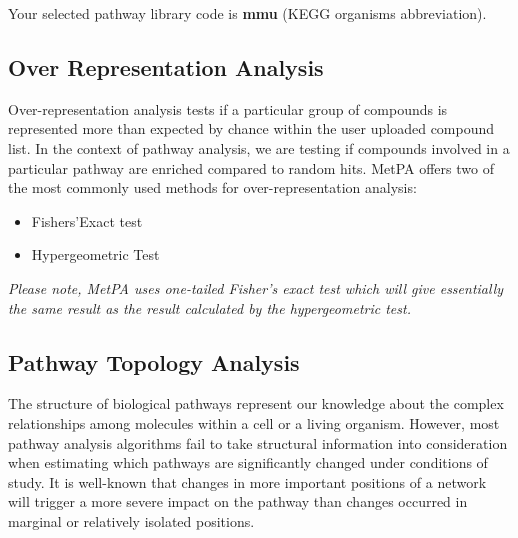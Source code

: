 \documentclass[a4paper]{article}
\begin{document}
Your selected pathway library code is \textbf{ mmu }(KEGG organisms abbreviation).


\subsection{Over Representation Analysis}

Over-representation analysis tests if a particular group of compounds
is represented more than expected by chance within the user uploaded compound
list. In the context of pathway analysis, we are testing if compounds involved
in a particular pathway are enriched compared to random hits. MetPA offers two of the
most commonly used methods for over-representation analysis: 

\begin{itemize}
\item{Fishers'Exact test}
\item{Hypergeometric Test}
\end{itemize}
\textit{Please note, MetPA uses one-tailed Fisher's exact test which will give essentially
the same result as the result calculated by the hypergeometric test.}






\subsection{Pathway Topology Analysis}

The structure of biological pathways represent our knowledge about the complex relationships among molecules
within a cell or a living organism. However, most pathway analysis algorithms fail to take structural information
into consideration when estimating which pathways are significantly changed under conditions of study. 
It is well-known that changes in more important positions of a network will trigger a more severe
impact on the pathway than changes occurred in marginal or relatively isolated positions.
\end{document}
